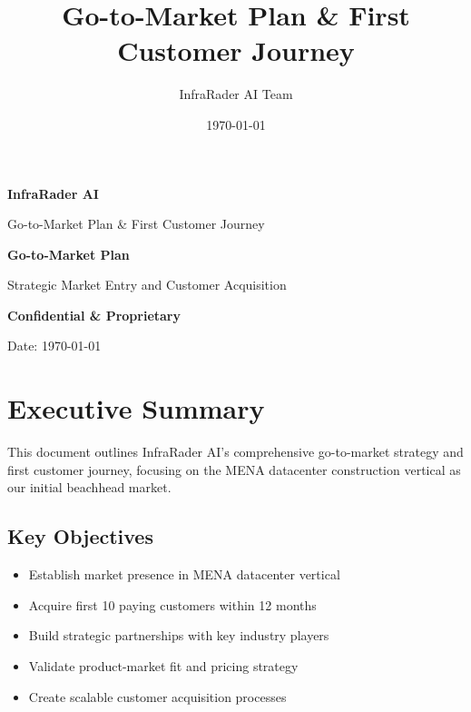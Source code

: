 \documentclass[business]{../templates/infraradar-main}
\title{Go-to-Market Plan \& First Customer Journey}
\author{InfraRader AI Team}
\date{\today}
\begin{document}
\begin{titlepage}
    \centering
    \vspace*{2cm}
    
    {\Huge\bfseries\color{infraradar@primary} InfraRader AI\par}
    \vspace{0.5cm}
    {\Large\color{infraradar@text} Go-to-Market Plan \& First Customer Journey\par}
    \vspace{2cm}
    
    {\huge\bfseries Go-to-Market Plan\par}
    \vspace{1cm}
    
    {\large Strategic Market Entry and Customer Acquisition\par}
    \vspace{2cm}
    
    {\large\bfseries\color{infraradar@primary} Confidential \& Proprietary\par}
    {\large Date: \today\par}
    
\end{titlepage}

\tableofcontents
\newpage

\section{Executive Summary}

This document outlines InfraRader AI's comprehensive go-to-market strategy and first customer journey, focusing on the MENA datacenter construction vertical as our initial beachhead market.

\subsection{Key Objectives}
\begin{itemize}
    \item Establish market presence in MENA datacenter vertical
    \item Acquire first 10 paying customers within 12 months
    \item Build strategic partnerships with key industry players
    \item Validate product-market fit and pricing strategy
    \item Create scalable customer acquisition processes
\end{itemize}
\end{document}

